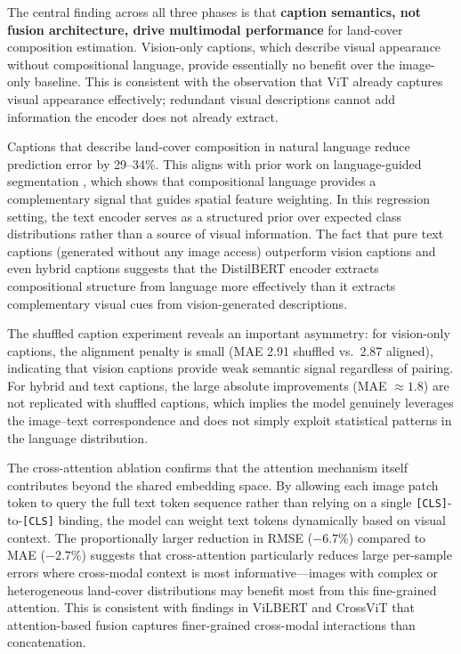 \documentclass[conference]{IEEEtran}
\begin{document}
The central finding across all three phases is that \textbf{caption semantics, not
fusion architecture, drive multimodal performance} for land-cover composition
estimation. Vision-only captions, which describe visual appearance without compositional
language, provide essentially no benefit over the image-only baseline. This is
consistent with the observation that ViT already captures visual appearance effectively;
redundant visual descriptions cannot add information the encoder does not already
extract.

Captions that describe land-cover composition in natural language reduce prediction
error by 29--34\%. This aligns with prior work on language-guided segmentation
\cite{yang2022lavt, xu2022groupvit}, which shows that compositional language provides a
complementary signal that guides spatial feature weighting. In this regression setting,
the text encoder serves as a structured prior over expected class distributions rather
than a source of visual information. The fact that pure text captions (generated without
any image access) outperform vision captions and even hybrid captions suggests that the
DistilBERT encoder extracts compositional structure from language more effectively than
it extracts complementary visual cues from vision-generated descriptions.

The shuffled caption experiment reveals an important asymmetry: for vision-only captions,
the alignment penalty is small (MAE 2.91 shuffled vs.\ 2.87 aligned), indicating that
vision captions provide weak semantic signal regardless of pairing. For hybrid and text
captions, the large absolute improvements (MAE $\approx 1.8$) are not replicated with
shuffled captions, which implies the model genuinely leverages the image--text
correspondence and does not simply exploit statistical patterns in the language
distribution.

The cross-attention ablation confirms that the attention mechanism itself contributes
beyond the shared embedding space. By allowing each image patch token to query the full
text token sequence rather than relying on a single \texttt{[CLS]}-to-\texttt{[CLS]}
binding, the model can weight text tokens dynamically based on visual context. The
proportionally larger reduction in RMSE ($-6.7\%$) compared to MAE ($-2.7\%$) suggests
that cross-attention particularly reduces large per-sample errors where cross-modal
context is most informative---images with complex or heterogeneous land-cover
distributions may benefit most from this fine-grained attention. This is consistent with
findings in ViLBERT \cite{lu2019vilbert} and CrossViT \cite{chen2021crossvit} that
attention-based fusion captures finer-grained cross-modal interactions than
concatenation.
\end{document}
